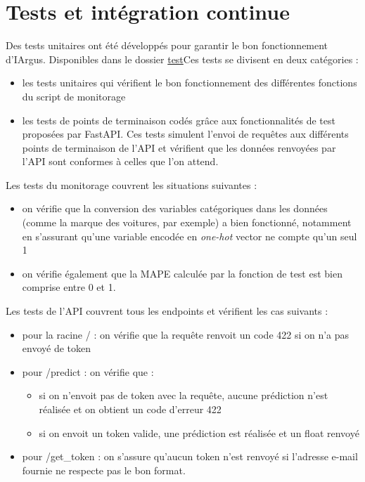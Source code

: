 \documentclass[french]{article}
\begin{document}
    

    \section{Tests et intégration continue}

    Des tests unitaires ont été développés pour garantir le bon fonctionnement d'IArgus. Disponibles dans le dossier \href{https://github.com/vinpap/iargus/tree/08493c829a37590847164a2f695db763736b9e35/iargus/test}{test}Ces tests se divisent en deux catégories :
    \begin{itemize}
        \item les tests unitaires qui vérifient le bon fonctionnement des différentes fonctions du script de monitorage
        \item les tests de points de terminaison codés grâce aux fonctionnalités de test proposées par FastAPI. Ces tests simulent l'envoi de requêtes aux différents points de terminaison de l'API et vérifient que les données renvoyées par l'API sont conformes à celles que l'on attend.
    \end{itemize}

    Les tests du monitorage couvrent les situations suivantes :
    \begin{itemize}
        \item on vérifie que la conversion des variables catégoriques dans les données (comme la marque des voitures, par exemple) a bien fonctionné, notamment en s'assurant qu'une variable encodée en \textit{one-hot} vector ne compte qu'un seul 1
        \item on vérifie également que la MAPE calculée par la fonction de test est bien comprise entre 0 et 1.
    \end{itemize}

    Les tests de l'API couvrent tous les endpoints et vérifient les cas suivants :
    \begin{itemize}
        \item pour la racine / : on vérifie que la requête renvoit un code 422 si on n'a pas envoyé de token
        \item pour /predict : on vérifie que :
        \begin{itemize}
            \item si on n'envoit pas de token avec la requête, aucune prédiction n'est réalisée et on obtient un code d'erreur 422
            \item si on envoit un token valide, une prédiction est réalisée et un float renvoyé
        \end{itemize}
        \item pour /get\_token : on s'assure qu'aucun token n'est renvoyé si l'adresse e-mail fournie ne respecte pas le bon format.
    \end{itemize}
\end{document}

